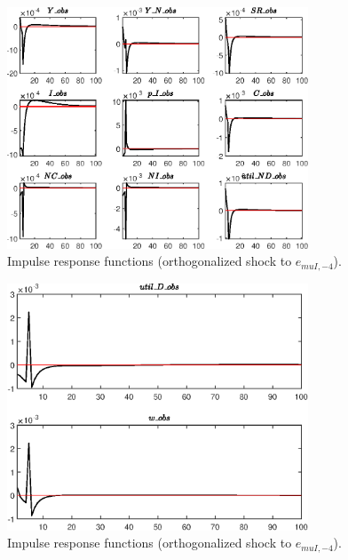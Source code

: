 \begin{figure}[H]
\centering 
\includegraphics[width=0.80\textwidth]{RBC_sectoral/graphs/RBC_sectoral_IRF_e_muI_news1}
\caption{Impulse response functions (orthogonalized shock to ${e_{muI,-4}}$).}\label{Fig:IRF:e_muI_news:1}
\end{figure}
 
\begin{figure}[H]
\centering 
\includegraphics[width=0.80\textwidth]{RBC_sectoral/graphs/RBC_sectoral_IRF_e_muI_news2}
\caption{Impulse response functions (orthogonalized shock to ${e_{muI,-4}}$).}\label{Fig:IRF:e_muI_news:2}
\end{figure}
 
 
